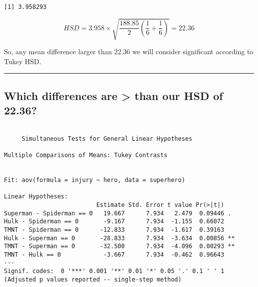 \documentclass[]{article}
\newenvironment{Shaded}{\begin{snugshade}}{\end{snugshade}}
\newcommand{\CommentTok}[1]{\textcolor[rgb]{0.56,0.35,0.01}{\textit{#1}}}
\newcommand{\DecValTok}[1]{\textcolor[rgb]{0.00,0.00,0.81}{#1}}
\newcommand{\FloatTok}[1]{\textcolor[rgb]{0.00,0.00,0.81}{#1}}
\newcommand{\KeywordTok}[1]{\textcolor[rgb]{0.13,0.29,0.53}{\textbf{#1}}}
\newcommand{\NormalTok}[1]{#1}
\newcommand{\StringTok}[1]{\textcolor[rgb]{0.31,0.60,0.02}{#1}}
\begin{document}
\begin{Shaded}
\end{Shaded}

\begin{verbatim}
[1] 3.958293
\end{verbatim}

\[HSD=3.958\times\sqrt{\frac{188.85}{2}({\frac{1}{6}+\frac{1}{6}})}=22.36\]

So, any mean difference larger than 22.36 we will consider significant
according to Tukey HSD.

\begin{center}\rule{0.5\linewidth}{\linethickness}\end{center}

\hypertarget{which-differences-are-than-our-hsd-of-22.36}{%
\subsection{Which differences are \textgreater{} than our HSD of
22.36?}\label{which-differences-are-than-our-hsd-of-22.36}}

\begin{verbatim}

     Simultaneous Tests for General Linear Hypotheses

Multiple Comparisons of Means: Tukey Contrasts


Fit: aov(formula = injury ~ hero, data = superhero)

Linear Hypotheses:
                          Estimate Std. Error t value Pr(>|t|)   
Superman - Spiderman == 0   19.667      7.934   2.479  0.09446 . 
Hulk - Spiderman == 0       -9.167      7.934  -1.155  0.66072   
TMNT - Spiderman == 0      -12.833      7.934  -1.617  0.39163   
Hulk - Superman == 0       -28.833      7.934  -3.634  0.00856 **
TMNT - Superman == 0       -32.500      7.934  -4.096  0.00293 **
TMNT - Hulk == 0            -3.667      7.934  -0.462  0.96643   
---
Signif. codes:  0 '***' 0.001 '**' 0.01 '*' 0.05 '.' 0.1 ' ' 1
(Adjusted p values reported -- single-step method)
\end{verbatim}
\end{document}
